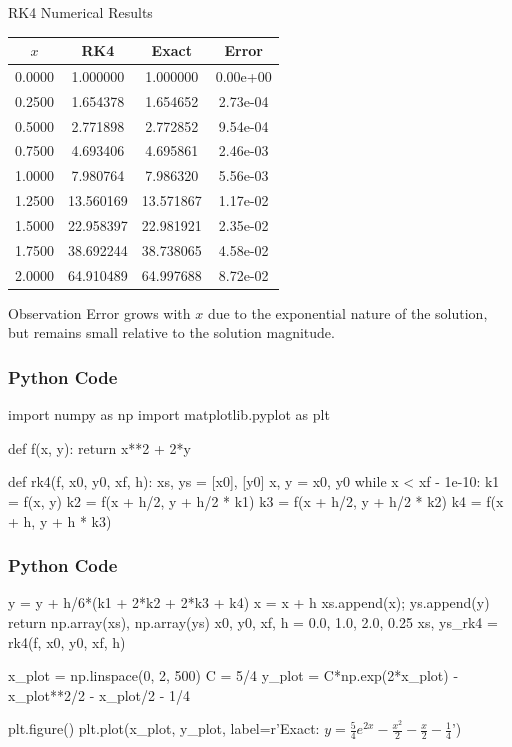 \documentclass{beamer}
\begin{document}
\begin{frame}{RK4 Numerical Results}
\begin{center}
\begin{tabular}{|c|c|c|c|}
\hline
$x$ & RK4 & Exact & Error \\
\hline
0.0000 & 1.000000  & 1.000000  & 0.00e+00 \\
0.2500 & 1.654378  & 1.654652  & 2.73e-04 \\
0.5000 & 2.771898  & 2.772852  & 9.54e-04 \\
0.7500 & 4.693406  & 4.695861  & 2.46e-03 \\
1.0000 & 7.980764  & 7.986320  & 5.56e-03 \\
1.2500 & 13.560169 & 13.571867 & 1.17e-02 \\
1.5000 & 22.958397 & 22.981921 & 2.35e-02 \\
1.7500 & 38.692244 & 38.738065 & 4.58e-02 \\
2.0000 & 64.910489 & 64.997688 & 8.72e-02 \\
\hline
\end{tabular}
\end{center}
\begin{block}{Observation}
Error grows with $x$ due to the exponential nature of the solution, but remains small relative to the solution magnitude.
\end{block}
\end{frame}

\begin{frame}[fragile]
\frametitle{Python Code}
\begin{mycode}
import numpy as np
import matplotlib.pyplot as plt

def f(x, y):
    return x**2 + 2*y

def rk4(f, x0, y0, xf, h):
    xs, ys = [x0], [y0]
    x, y = x0, y0
    while x < xf - 1e-10:
        k1 = f(x, y)
        k2 = f(x + h/2, y + h/2 * k1)
        k3 = f(x + h/2, y + h/2 * k2)
        k4 = f(x + h, y + h * k3)
       
\end{mycode}
\end{frame}

\begin{frame}[fragile]
\frametitle{Python Code}
\begin{mycode}
 y = y + h/6*(k1 + 2*k2 + 2*k3 + k4)
        x = x + h
        xs.append(x); ys.append(y)
    return np.array(xs), np.array(ys)
x0, y0, xf, h = 0.0, 1.0, 2.0, 0.25
xs, ys_rk4 = rk4(f, x0, y0, xf, h)

x_plot = np.linspace(0, 2, 500)
C = 5/4
y_plot = C*np.exp(2*x_plot) - x_plot**2/2 - x_plot/2 - 1/4

plt.figure()
plt.plot(x_plot, y_plot,
    label=r'Exact: $y=\frac{5}{4}e^{2x}-\frac{x^2}{2}-\frac{x}{2}-\frac{1}{4}$')

\end{mycode}
\end{frame}
\end{document}
